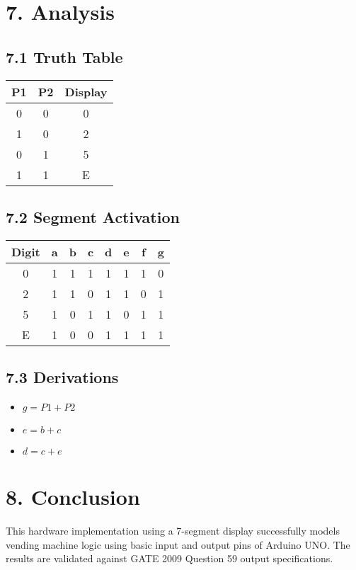 \documentclass[12pt]{article}
\begin{document}
\vspace{1em}
\section*{7. Analysis}
\subsection*{7.1 Truth Table}
\begin{table}[H]
\centering
\begin{tabular}{|c|c|c|}
\hline
\textbf{P1} & \textbf{P2} & \textbf{Display} \\
\hline
0 & 0 & 0 \\
1 & 0 & 2 \\
0 & 1 & 5 \\
1 & 1 & E \\
\hline
\end{tabular}
\end{table}

\subsection*{7.2 Segment Activation}
\begin{table}[H]
\centering
\small
\begin{tabular}{|c|c|c|c|c|c|c|c|}
\hline
\textbf{Digit} & a & b & c & d & e & f & g \\
\hline
0 & 1 & 1 & 1 & 1 & 1 & 1 & 0 \\
2 & 1 & 1 & 0 & 1 & 1 & 0 & 1 \\
5 & 1 & 0 & 1 & 1 & 0 & 1 & 1 \\
E & 1 & 0 & 0 & 1 & 1 & 1 & 1 \\
\hline
\end{tabular}
\end{table}

\subsection*{7.3 Derivations}
\begin{itemize}
    \item $g = P1 + P2$
    \item $e = b + c$
    \item $d = c + e$
\end{itemize}

\vspace{1em}
\section*{8. Conclusion}
This hardware implementation using a 7-segment display successfully models vending machine logic using basic input and output pins of Arduino UNO. The results are validated against GATE 2009 Question 59 output specifications.
\end{document}
